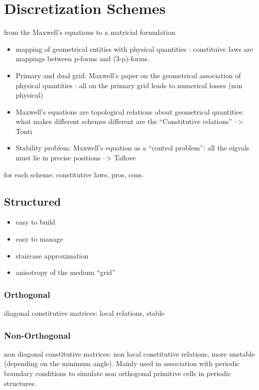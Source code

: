 \chapter{Discretization Schemes}
from the Maxwell's equations to a matricial formulation
\begin{itemize}
\item
  mapping of geometrical entities with physical quantities
  \cite[pag. 40]{bossavit_computational}: constituive laws are
  mappings between p-forms and (3-p)-forms.
\item
  Primary and dual grid: Maxwell's paper on the geometrical
  association of physical quantities \cite{maxwell_mathematical}: all
  on the primary grid leads to numerical losses (non physical)
\item
  Maxwell's equations are topological relations about geometrical
  quantities: what makes different schemes different are the
  ``Constitutive relations'' --> Tonti
\item
  Stability problem: Maxwell's equation as a ``control problem'': all
  the eigvals must lie in precise positions --> Taflove
\end{itemize}

for each scheme: constitutive laws, pros, cons.

\section{Structured}
\begin{itemize}
\item
  easy to build
\item
  easy to manage
\item
  staircase approximation \cite{cangellaris_analysis}
\item
  anisotropy of the medium ``grid'' \cite{liu_fourier}
\end{itemize}

\subsection{Orthogonal}
diagonal constitutive matrices: local relations, stable

\subsection{Non-Orthogonal}
non diagonal constitutive matrices: non local constitutive relations,
more unstable (depending on the minimum angle). Mainly used in
association with periodic boundary conditions to simulate non
orthogonal primitive cells in periodic structures.




